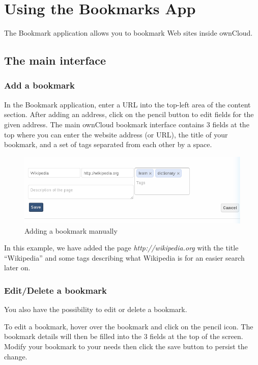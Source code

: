 \documentclass[letterpaper,10pt,english]{sphinxmanual}
\begin{document}
\chapter{Using the Bookmarks App}
\label{bookmarks:using-the-bookmarks-app}\label{bookmarks::doc}
The Bookmark application allows you to bookmark Web sites inside ownCloud.


\section{The main interface}
\label{bookmarks:the-main-interface}

\subsection{Add a bookmark}
\label{bookmarks:add-a-bookmark}
In the Bookmark application, enter a URL into the top-left area of the content section. After adding an address, click on the pencil button to edit fields for the given address.
The main ownCloud bookmark interface contains 3 fields at the top where
you can enter the website address (or URL), the title of your bookmark, and
a set of tags separated from each other by a space.
\begin{figure}[htbp]
\centering
\capstart

\includegraphics{bookmark_addurl.png}
\caption{Adding a bookmark manually}\end{figure}

In this example, we have added the page \emph{http://wikipedia.org} with the title ``Wikipedia''
and some tags describing what Wikipedia is for an easier search later on.


\subsection{Edit/Delete a bookmark}
\label{bookmarks:edit-delete-a-bookmark}
You also have the possibility to edit or delete a bookmark.

To edit a bookmark, hover over the bookmark and click on the pencil icon.
The bookmark details will then be filled into the 3 fields at the top of the screen.
Modify your bookmark to your needs then click the save button to persist the change.
\end{document}
